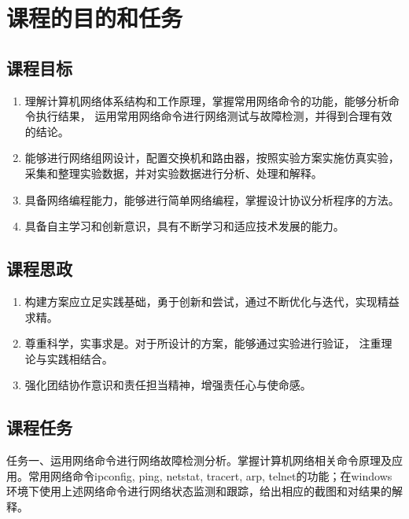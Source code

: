 \documentclass[UTF8,12pt,a4paper]{ctexart}
\begin{document}


\tableofcontents
\newpage

\section{课程的目的和任务}

\subsection{课程目标}

\begin{enumerate}[label=（\arabic*）, leftmargin=2em, itemsep=0.6em]
  \item 理解计算机网络体系结构和工作原理，掌握常用网络命令的功能，能够分析命令执行结果，
        运用常用网络命令进行网络测试与故障检测，并得到合理有效的结论。
  \item 能够进行网络组网设计，配置交换机和路由器，按照实验方案实施仿真实验，
        采集和整理实验数据，并对实验数据进行分析、处理和解释。
  \item 具备网络编程能力，能够进行简单网络编程，掌握设计协议分析程序的方法。
  \item 具备自主学习和创新意识，具有不断学习和适应技术发展的能力。
\end{enumerate}

\subsection{课程思政}

\begin{enumerate}[label=（\arabic*）, leftmargin=2em, itemsep=0.6em]
  \item 构建方案应立足实践基础，勇于创新和尝试，通过不断优化与迭代，实现精益求精。
  \item 尊重科学，实事求是。对于所设计的方案，能够通过实验进行验证，
        注重理论与实践相结合。
  \item 强化团结协作意识和责任担当精神，增强责任心与使命感。
\end{enumerate}

 
\subsection{课程任务}
 任务一、运用网络命令进行网络故障检测分析。掌握计算机网络相关命令原理及应用。常用网络命令ipconfig, ping, netstat, tracert, arp, telnet的功能；在windows环境下使用上述网络命令进行网络状态监测和跟踪，给出相应的截图和对结果的解释。
\end{document}
